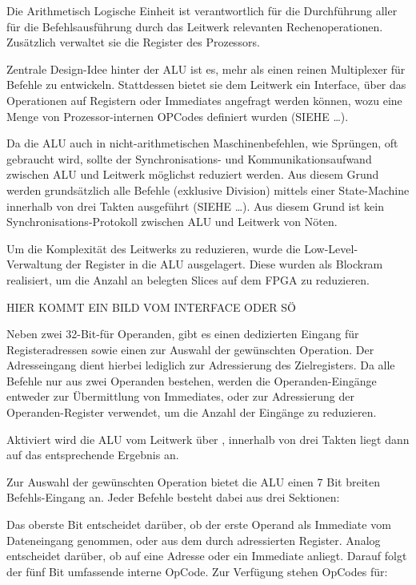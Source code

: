 Die Arithmetisch Logische Einheit ist verantwortlich f\"ur die Durchf\"uhrung aller f\"ur die Befehlsausf\"uhrung durch das Leitwerk relevanten Rechenoperationen. Zusätzlich verwaltet sie die Register des Prozessors.

Zentrale Design-Idee hinter der ALU ist es, mehr als einen reinen Multiplexer f\"ur Befehle zu entwickeln. Stattdessen bietet sie dem Leitwerk ein Interface,
\"uber das Operationen auf Registern oder Immediates angefragt werden k\"onnen, wozu eine Menge von Prozessor-internen OPCodes definiert wurden (SIEHE …).

Da die ALU auch in nicht-arithmetischen Maschinenbefehlen, wie Spr\"ungen, oft gebraucht wird, sollte der Synchronisations- und Kommunikationsaufwand zwischen ALU und Leitwerk m\"oglichst reduziert werden.
Aus diesem Grund werden grundsätzlich alle Befehle (exklusive Division) mittels einer State-Machine innerhalb von drei Takten ausgef\"uhrt (SIEHE …). Aus diesem Grund ist kein Synchronisations-Protokoll zwischen ALU und Leitwerk von N\"oten.

Um die Komplexität des Leitwerks zu reduzieren, wurde die Low-Level-Verwaltung der Register in die ALU ausgelagert. Diese wurden als Blockram realisiert, um die Anzahl an belegten Slices auf dem FPGA zu reduzieren.

HIER KOMMT EIN BILD VOM INTERFACE ODER S\"O

Neben zwei 32-Bit-f\"ur Operanden, gibt es einen dedizierten Eingang f\"ur Registeradressen sowie einen zur Auswahl der gew\"unschten Operation. 
Der Adresseingang dient hierbei lediglich zur Adressierung des Zielregisters. Da alle Befehle nur aus zwei Operanden bestehen, werden die Operanden-Eingänge entweder zur \"Ubermittlung von Immediates, oder zur Adressierung der Operanden-Register verwendet, um die Anzahl der Eingänge zu reduzieren.

Aktiviert wird die ALU vom Leitwerk \"uber , innerhalb von drei Takten liegt dann auf  das entsprechende Ergebnis an.

Zur Auswahl der gew\"unschten Operation bietet die ALU einen 7 Bit breiten Befehls-Eingang an.
Jeder Befehle besteht dabei aus drei Sektionen\vspace{10pt}:

\vspace{5pt}

Das oberste Bit  entscheidet dar\"uber, ob der erste Operand als Immediate vom Dateneingang  genommen, oder aus dem durch  adressierten Register.
Analog entscheidet  dar\"uber, ob auf  eine Adresse oder ein Immediate anliegt.
Darauf folgt der f\"unf Bit umfassende interne OpCode. Zur Verf\"ugung stehen OpCodes f\"ur:


